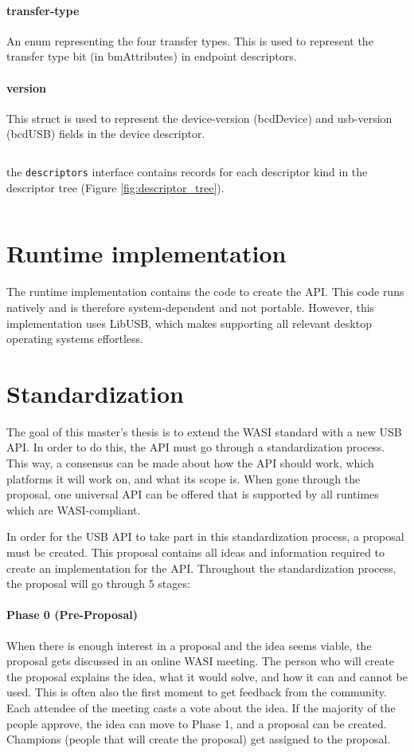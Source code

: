 \paragraph{transfer-type}
An enum representing the four transfer types. This is used to represent the transfer type bit (in bmAttributes) in endpoint descriptors.

\paragraph{version}
This struct is used to represent the device-version (bcdDevice) and usb-version (bcdUSB) fields in the device descriptor.

\inputminted{yaml}{wit/descriptors.wit}

the \texttt{descriptors} interface contains records for each descriptor kind in the descriptor tree (Figure \ref{fig:descriptor_tree}).

\inputminted{yaml}{wit/device.wit}

\section{Runtime implementation}
The runtime implementation contains the code to create the API. This code runs natively and is therefore system-dependent and not portable. However, this implementation uses LibUSB, which makes supporting all relevant desktop operating systems effortless.

\section{Standardization}
The goal of this master's thesis is to extend the WASI standard with a new USB API. In order to do this, the API must go through a standardization process. This way, a consensus can be made about how the API should work, which platforms it will work on, and what its scope is. When gone through the proposal, one universal API can be offered that is supported by all runtimes which are WASI-compliant.

In order for the USB API to take part in this standardization process, a proposal must be created. This proposal contains all ideas and information required to create an implementation for the API. Throughout the standardization process, the proposal will go through 5 stages:

\paragraph{Phase 0 (Pre-Proposal)}
When there is enough interest in a proposal and the idea seems viable, the proposal gets discussed in an online WASI meeting. The person who will create the proposal explains the idea, what it would solve, and how it can and cannot be used. This is often also the first moment to get feedback from the community. Each attendee of the meeting casts a vote about the idea. If the majority of the people approve, the idea can move to Phase 1, and a proposal can be created. Champions (people that will create the proposal) get assigned to the proposal.

